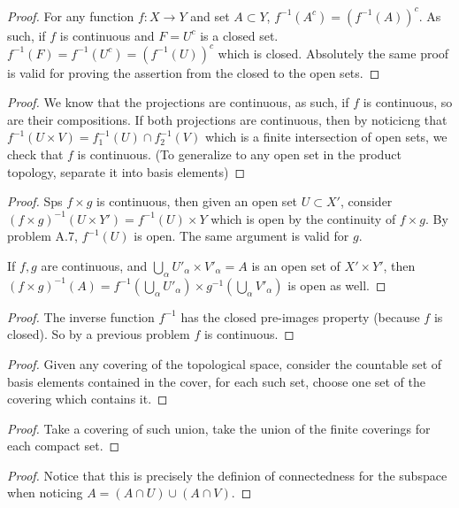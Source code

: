 \prob
\begin{proof}
	For any function $f:X \to Y$ and set $A \subset Y$, $f^{-1}(A^c) = (f^{-1}(A))^c$. As such, if $f$ is continuous
	and $F = U^c$ is a closed set. $f^{-1}(F) = f^{-1}(U^c) = (f^{-1}(U))^c$ which is closed.
	Absolutely the same proof is valid for proving the assertion from the closed to the open sets.
\end{proof}

\prob
\begin{proof}
	We know that the projections are continuous, as such, if $f$ is continuous, so are their compositions.
	If both projections are continuous, then by noticicng that $f^{-1}(U \times V) = f_1^{-1}(U) \cap f_2^{-1}(V)$ which
	is a finite intersection of open sets, we check that $f$ is continuous. (To generalize to any open set in the product topology, separate it
	into basis elements)
\end{proof}

\prob
\begin{proof}
	Sps $f \times g$ is continuous, then given an open set $U \subset X'$, consider $(f\times g)^{-1}(U \times Y') = f^{-1}(U) \times Y$ which is open
	by the continuity of $f \times g$. By problem A.7, $f^{-1}(U)$ is open. The same argument is valid for $g$.

	If $f,g$ are continuous, and $\bigcup_\alpha U'_\alpha \times V'_\alpha = A$ is an open set of $X'\times Y'$, then $(f \times g)^{-1}(A)
		= f^{-1}(\bigcup_\alpha U'_\alpha) \times g^{-1}(\bigcup_\alpha V'_\alpha)$ is open as well.
\end{proof}

\prob
\begin{proof}
	The inverse function $f^{-1}$ has the closed pre-images property (because $f$ is closed). So by a previous problem $f$ is continuous.
\end{proof}

\prob
\begin{proof}
	Given any covering of the topological space, consider the countable set of basis elements contained in the cover, for
	each such set, choose one set of the covering which contains it.
\end{proof}

\prob
\begin{proof}
	Take a covering of such union, take the union of the finite coverings for each compact set.
\end{proof}

\prob
\begin{proof}
	Notice that this is precisely the definion of connectedness for the subspace when noticing $A = (A\cap U) \cup (A \cap V)$.
\end{proof}

